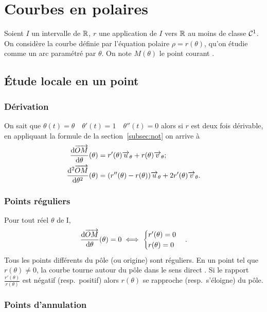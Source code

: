 \section{Courbes en polaires}

Soient \(I\) un intervalle de \(\mathbb{R}\), \(r\) une application de \(I\) vers \(\mathbb{R}\) au
moins de classe \(\mathcal{C}^{1}\). On considère la courbe définie par l'équation
polaire \(\rho = r(\theta)\), qu'on étudie comme un arc paramétré par
\(\theta\). On note \(M(\theta)\) le point \og courant \fg{}.

\subsection{Étude locale en un point}

\subsubsection{Dérivation}

On sait que \(\theta(t)=\theta \quad \theta'(t)=1 \quad \theta''(t)=0\) alors si
\(r\) est deux fois dérivable, en appliquant la formule de la
section~\ref{subsec:not} on arrive à
\begin{align}
  \dfrac{\mathrm{d} \overrightarrow{OM}}{\mathrm{d} \theta}(\theta)&=r'(\theta) \overrightarrow{u}_\theta + r(\theta)
  \overrightarrow{v}_\theta;\\
  \dfrac{\mathrm{d}^2 \overrightarrow{OM}}{\mathrm{d} {\theta}^2}(\theta)&=(r''(\theta)-r(\theta)) \overrightarrow{u}_\theta +
  2r'(\theta) \overrightarrow{v}_\theta.
\end{align}

\subsubsection{Points réguliers}

Pour tout réel \(\theta\) de I,
\begin{equation}
  \dfrac{\mathrm{d} \overrightarrow{OM}}{\mathrm{d} \theta}(\theta)=0 \iff
  \begin{cases}
    r'(\theta) = 0 \\ r(\theta)=0
  \end{cases}.
\end{equation}
Tous les points différents du pôle (ou origine) sont réguliers. En un point tel
que \(r(\theta) \neq 0\), la courbe \og tourne autour du pôle dans le sens
direct \fg{}. Si le rapport \(\frac{r'(\theta)}{r(\theta)}\) est négatif (resp.\
positif) alors \(r(\theta)\) se rapproche (resp.\ s'éloigne) du pôle.

\subsubsection{Points d'annulation}

